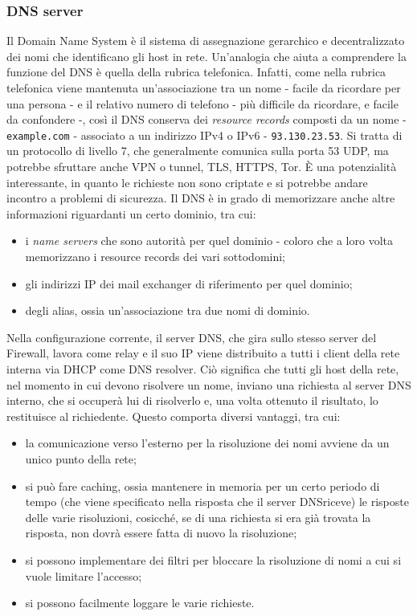 \subsubsection{DNS server}
Il Domain Name System è il sistema di assegnazione gerarchico e decentralizzato dei nomi che identificano gli host in rete. Un'analogia che aiuta a comprendere la funzione del DNS è quella della rubrica telefonica.
Infatti, come nella rubrica telefonica viene mantenuta un'associazione tra un nome - facile da ricordare per una persona -  e il relativo numero di telefono - più difficile da ricordare, e facile da confondere -, così il DNS conserva dei \emph{resource records} composti da un nome - \texttt{example.com} - associato a un indirizzo IPv4 o IPv6 -  \texttt{93.130.23.53}.
Si tratta di un protocollo di livello 7, che generalmente comunica sulla porta 53 UDP, ma potrebbe sfruttare anche VPN o tunnel, TLS, HTTPS, Tor. È una potenzialità interessante, in quanto le richieste non sono criptate e si potrebbe andare incontro a problemi di sicurezza.
Il DNS è in grado di memorizzare anche altre informazioni riguardanti un certo dominio, tra cui:
\begin{itemize}
    \item i \emph{name servers} che sono autorità per quel dominio - coloro che a loro volta memorizzano i resource records dei vari sottodomini;
    \item gli indirizzi IP dei mail exchanger di riferimento per quel dominio;
    \item degli alias, ossia un'associazione tra due nomi di dominio.
\end{itemize}
Nella configurazione corrente, il server DNS, che gira sullo stesso server del Firewall, lavora come relay e il suo IP viene distribuito a tutti i client della rete interna via DHCP come DNS resolver.
Ciò significa che tutti gli host della rete, nel momento in cui devono risolvere un nome, inviano una richiesta al server DNS interno, che si occuperà lui di risolverlo e, una volta ottenuto il risultato, lo restituisce al richiedente.
Questo comporta diversi vantaggi, tra cui:
\begin{itemize}
    \item la comunicazione verso l'esterno per la risoluzione dei nomi avviene da un unico punto della rete;
    \item si può fare caching, ossia mantenere in memoria per un certo periodo di tempo (che viene specificato nella risposta che il server DNSriceve) le risposte delle varie risoluzioni, cosicché, se di una richiesta si era già trovata la risposta, non dovrà essere fatta di nuovo la risoluzione;
    \item si possono implementare dei filtri per bloccare la risoluzione di nomi a cui si vuole limitare l'accesso;
    \item si possono facilmente loggare le varie richieste.
\end{itemize}

